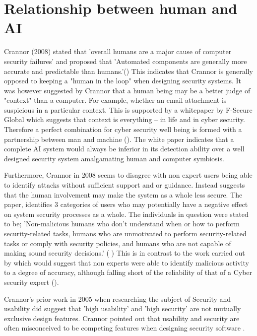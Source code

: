 \section{Relationship between human and AI}

Crannor (2008) stated that 'overall humans are a major cause of computer security failures' and proposed that 'Automated components are generally more accurate and predictable than humans.'(\cite{cranor2008framework}) This indicates that Crannor is generally opposed to keeping a "human in the loop" when designing security systems. It was however suggested by Crannor that a human being may be a better judge of "context" than a computer. For example, whether an email attachment is suspicious in a particular context. This is supported by a whitepaper by F-Secure Global which suggests that context is everything – in life and in cyber security. Therefore a perfect combination for cyber security well being is formed with a partnership between man and machine (\cite{TargetedCyberSecurity}). The white paper indicates that a complete AI system would always be inferior in its detection ability over a well designed security system amalgamating human and computer symbiosis. 

Furthermore, Crannor in 2008 seems to disagree with non expert users being able to identify attacks without sufficient support and or guidance. Instead suggests that the human involvement may make the system as a whole less secure. The paper, identifies 3 categories of users who may potentially have a negative effect on system security processes as a whole. The individuals in question were stated to be; 'Non-malicious humans who don't understand when or how to perform security-related tasks, humans who are unmotivated to perform security-related tasks or comply with security policies, and humans who are  not capable of making sound security decisions.' (\citeauthor{cranor2008framework} \citeyear{cranor2008framework}) This is in contrast to the work carried out by \citeauthor{ben2015effects} which would suggest that non experts were able to identify malicious activity to a degree of accuracy, although falling short of the reliability of that of a Cyber security expert (\cite{ben2015effects}).
 
Crannor's prior work in 2005 when researching the subject of Security and usability did suggest that 'high usability' and 'high security' are not mutually exclusive design features. Crannor pointed out that usability and security are often misconceived to be competing features when designing security software \cite{cranor2005security}.

